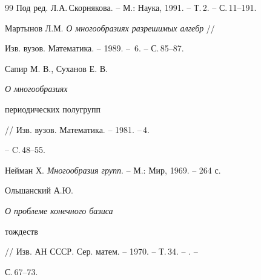 \begin{thebibliography}{99}
Под ред. Л.А.\,Скорнякова. -- М.: Наука, 1991. -- Т.\,2. -- С.\,11--191.




Мартынов Л.М. {\em О многообразиях разрешимых алгебр} //


Изв. вузов. Математика. -- 1989. -- \No\,6. -- С.\,85--87. 




Сапир М. В., Суханов Е. В. {\it О многообразиях


периодических полугрупп} // Изв. вузов. Математика. -- 1981. --\No\,4.


-- C.\,48--55.




Нейман Х. {\em Многообразия групп}. -- М.: Мир, 1969. -- 264 с.




Ольшанский А.Ю. {\em О проблеме конечного базиса


тождеств} // Изв. АН СССР. Сер. матем. -- 1970. -- Т.\,34. -- . --


С.\,67--73.








\end{thebibliography}





\vskip 2cm












\label{end}





